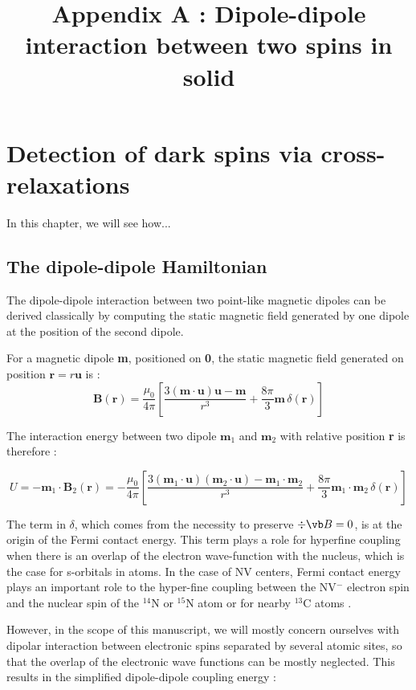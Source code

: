 \documentclass[a4paper]{report}
\title{Appendix A : Dipole-dipole interaction between two spins in solid}
\begin{document}
\chapter{Detection of dark spins via cross-relaxations}
In this chapter, we will see how...
\section{The dipole-dipole Hamiltonian}
The dipole-dipole interaction between two point-like magnetic dipoles can be derived classically by computing the static magnetic field generated by one dipole at the position of the second dipole.

For a magnetic dipole \textbf{m}, positioned on \textbf{0}, the static magnetic field generated on position $\mathbf{r}=r\mathbf{u}$ is : \cite[p.~188]{jackson1999classical} 
\begin{equation}
\mathbf{B}(\mathbf{r})=\frac{\mu_0}{4 \pi}\left[ \frac{3 (\mathbf{m}\cdot\mathbf{u})\mathbf{u} - \mathbf{m}}{r^3}+\frac{8\pi}{3}\mathbf{m}\,\delta(\mathbf{r})\right]
\end{equation}

The interaction energy between two dipole $\mathbf{m}_1$ and $\mathbf{m}_2$ with relative position \textbf{r} is therefore :

\begin{equation}
U=-\mathbf{m}_1 \cdot \mathbf{B}_2(\mathbf{r})=-\frac{\mu_0}{4 \pi}\left[ \frac{3 (\mathbf{m}_1\cdot\mathbf{u})(\mathbf{m}_2\cdot\mathbf{u}) - \mathbf{m}_1\cdot\mathbf{m}_2}{r^3}+\frac{8\pi}{3}\mathbf{m}_1\cdot\mathbf{m}_2\,\delta(\mathbf{r})\right]
\end{equation}

The term in $\delta$, which comes from the necessity to preserve $\div{\vb B}=0$, is at the origin of the Fermi contact energy. This term plays a role for hyperfine coupling when there is an overlap of the electron wave-function with the nucleus, which is the case for s-orbitals in atoms. In the case of NV centers, Fermi contact energy plays an important role to the hyper-fine coupling between the NV$^-$ electron spin and the nuclear spin of the $^{14}$N or $^{15}$N atom \cite{doherty2012theory} or for nearby $^{13}$C atoms \cite{smeltzer201113c}.

However, in the scope of this manuscript, we will mostly concern ourselves with dipolar interaction between electronic spins separated by several atomic sites, so that the overlap of the electronic wave functions can be mostly neglected. This results in the simplified dipole-dipole coupling energy :
\end{document}
